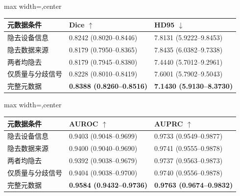 
\begin{responsetable}
\caption{}
\begin{adjustbox}{max width=\textwidth,center}
\begin{tabular}{@{}l l l@{}}
\toprule
元数据条件 & Dice $\uparrow$ & HD95 $\downarrow$ \\
\midrule
隐去设备信息 & 0.8242 (0.8020--0.8446) & 7.8131 (5.9222--9.8453) \\
隐去数据来源 & 0.8179 (0.7950--0.8365) & 7.8435 (6.0382--9.7338) \\
两者均隐去 & 0.8179 (0.7945--0.8380) & 7.4440 (5.7012--9.2961) \\
仅质量与分歧信号 & 0.8228 (0.8010--0.8419) & 7.6001 (5.7902--9.5043) \\
完整元数据 & \textbf{0.8388 (0.8260--0.8516)} & \textbf{7.1430 (5.9130--8.3730)} \\
\bottomrule
\end{tabular}
\end{adjustbox}
\end{responsetable}

\begin{responsetable}
\caption{}
\begin{adjustbox}{max width=\textwidth,center}
\begin{tabular}{@{}l l l@{}}
\toprule
元数据条件 & AUROC $\uparrow$ & AUPRC $\uparrow$ \\
\midrule
隐去设备信息 & 0.9403 (0.9048--0.9699) & 0.9733 (0.9549--0.9877) \\
隐去数据来源 & 0.9400 (0.9040--0.9690) & 0.9741 (0.9555--0.9878) \\
两者均隐去 & 0.9392 (0.9038--0.9679) & 0.9737 (0.9563--0.9873) \\
仅质量与分歧信号 & 0.9404 (0.9038--0.9700) & 0.9740 (0.9556--0.9878) \\
完整元数据 & \textbf{0.9584 (0.9432--0.9736)} & \textbf{0.9763 (0.9674--0.9832)} \\
\bottomrule
\end{tabular}
\end{adjustbox}
\end{responsetable}
